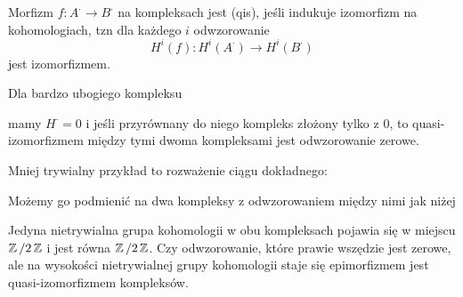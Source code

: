 \begin{definition}
  Morfizm $f:A^\cdot\to B^\cdot$ na kompleksach jest  (qis), jeśli indukuje izomorfizm na kohomologiach, tzn dla każdego $i$ odwzorowanie
  $$H^i(f):H^i(A^\cdot)\to H^i(B^\cdot)$$
  jest izomorfizmem.
\end{definition}

\begin{example}
  \item Dla bardzo ubogiego kompleksu
    \begin{center}\end{center}
    mamy $H^\cdot =0 $ i jeśli przyrównany do niego kompleks złożony tylko z $0$, to quasi-izomorfizmem między tymi dwoma kompleksami jest odwzorowanie zerowe.
  \item Mniej trywialny przykład to rozważenie ciągu dokładnego:
    \begin{center}\end{center}
    Możemy go podmienić na dwa kompleksy z odwzorowaniem między nimi jak niżej
    \begin{center}\end{center}
    Jedyna nietrywialna grupa kohomologii w obu kompleksach pojawia się w miejscu $\operatorname{\mathbb{Z}}/2\operatorname{\mathbb{Z}}$ i jest równa $\operatorname{\mathbb{Z}}/2\operatorname{\mathbb{Z}}$. Czy odwzorowanie, które prawie wszędzie jest zerowe, ale na wysokości nietrywialnej grupy kohomologii staje się epimorfizmem jest quasi-izomorfizmem kompleksów.
\end{example}

